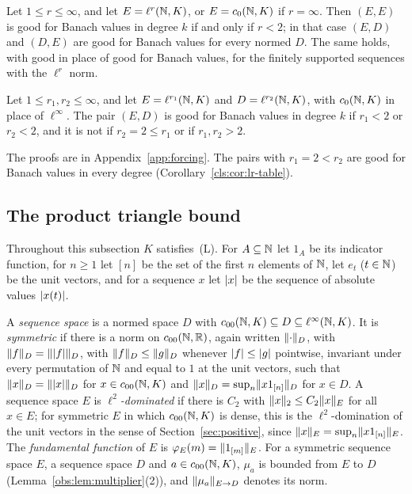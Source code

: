 \begin{corollary}\label{fib:cor:threshold}
Let $1\le r\le\infty$, and let $E=\ell^r(\mathbb N,K)$, or $E=c_0(\mathbb N,K)$ if $r=\infty$. Then $(E,E)$ is good for Banach
values in degree $k$ if and only if $r<2$; in that case $(E,D)$ and $(D,E)$ are good for Banach values for every normed
$D$. The same holds, with good in place of good for Banach values, for the finitely supported sequences with the
$\ell^r$ norm.
\end{corollary}

\begin{corollary}\label{fib:cor:pairs}
Let $1\le r_1,r_2\le\infty$, and let $E=\ell^{r_1}(\mathbb N,K)$ and $D=\ell^{r_2}(\mathbb N,K)$, with $c_0(\mathbb N,K)$ in place of
$\ell^\infty$. The pair $(E,D)$ is good for Banach values in degree $k$ if $r_1<2$ or $r_2<2$, and it is not if
$r_2=2\le r_1$ or if $r_1,r_2>2$.
\end{corollary}

The proofs are in Appendix~\ref{app:forcing}. The pairs with $r_1=2<r_2$ are good for Banach values in every degree
(Corollary~\ref{cls:cor:lr-table}).

\subsection{The product triangle bound}\label{obs:ssec:ptb}
Throughout this subsection $K$ satisfies~\textup{(L)}. For $A\subseteq\mathbb N$ let $1_A$ be its indicator function, for
$n\ge1$ let $[n]$ be the set of the first $n$ elements of $\mathbb N$, let $e_t$ ($t\in\mathbb N$) be the unit vectors, and for a
sequence $x$ let $\lvert x\rvert$ be the sequence of absolute values $\lvert x(t)\rvert$.

\begin{definition}\label{obs:def:sequence-spaces}
A \emph{sequence space} is a normed space $D$ with $c_{00}(\mathbb N,K)\subseteq D\subseteq\ell^\infty(\mathbb N,K)$. It is
\emph{symmetric} if there is a norm on $c_{00}(\mathbb N,\mathbb R)$, again written $\lVert \cdot\rVert_D$, with
$\lVert f\rVert_D=\lVert \lvert f\rvert\rVert_D$, with $\lVert f\rVert_D\le\lVert g\rVert_D$ whenever $\lvert f\rvert\le\lvert g\rvert$ pointwise, invariant under every
permutation of $\mathbb N$ and equal to $1$ at the unit vectors, such that $\lVert x\rVert_D=\lVert \lvert x\rvert\rVert_D$ for $x\in c_{00}(\mathbb N,K)$ and
$\lVert x\rVert_D=\sup_n\lVert x1_{[n]}\rVert_D$ for $x\in D$. A sequence space $E$ is \emph{$\ell^2$\nobreakdash-dominated} if there is
$C_2$ with $\lVert x\rVert_2\le C_2\lVert x\rVert_E$ for all $x\in E$; for symmetric $E$ in which $c_{00}(\mathbb N,K)$ is dense, this is the
$\ell^2$\nobreakdash-domination of the unit vectors in the sense of Section~\ref{sec:positive}, since $\lVert x\rVert_E=\sup_n\lVert x1_{[n]}\rVert_E$. The
\emph{fundamental function} of $E$ is $\varphi_E(m)=\lVert 1_{[m]}\rVert_E$. For a symmetric sequence space $E$, a sequence
space $D$ and $a\in c_{00}(\mathbb N,K)$, $\mu_a$ is bounded from $E$ to $D$ (Lemma~\ref{obs:lem:multiplier}(2)), and
$\lVert \mu_a\rVert_{E\to D}$ denotes its norm.
\end{definition}

